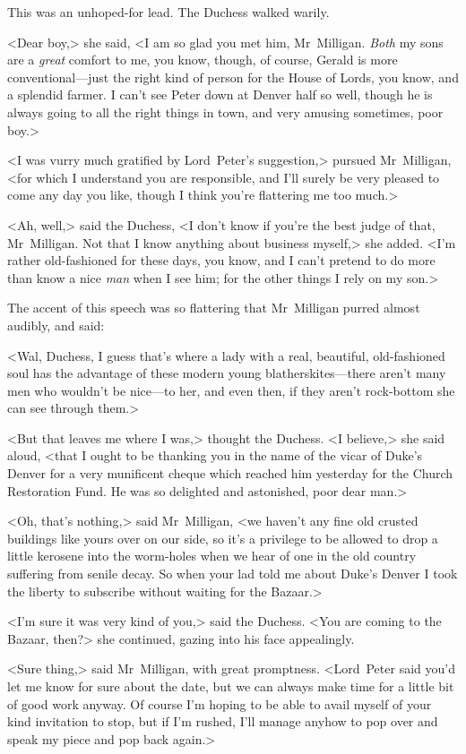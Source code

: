 This was an unhoped-for lead. The Duchess walked warily.

<Dear boy,> she said, <I am so glad you met him, Mr~Milligan. \textit{Both} my sons are a \textit{great} comfort to me, you know, though, of course, Gerald is more conventional—just the right kind of person for the House of Lords, you know, and a splendid farmer. I can't see Peter down at Denver half so well, though he is always going to all the right things in town, and very amusing sometimes, poor boy.>

<I was vurry much gratified by Lord~Peter's suggestion,> pursued Mr~Milligan, <for which I understand you are responsible, and I'll surely be very pleased to come any day you like, though I think you're flattering me too much.>

<Ah, well,> said the Duchess, <I don't know if you're the best judge of that, Mr~Milligan. Not that I know anything about business myself,> she added. <I'm rather old-fashioned for these days, you know, and I can't pretend to do more than know a nice \textit{man} when I see him; for the other things I rely on my son.>

The accent of this speech was so flattering that Mr~Milligan purred almost audibly, and said:

<Wal, Duchess, I guess that's where a lady with a real, beautiful, old-fashioned soul has the advantage of these modern young blatherskites—there aren't many men who wouldn't be nice—to her, and even then, if they aren't rock-bottom she can see through them.>

<But that leaves me where I was,> thought the Duchess. <I believe,> she said aloud, <that I ought to be thanking you in the name of the vicar of Duke's Denver for a very munificent cheque which reached him yesterday for the Church Restoration Fund. He was so delighted and astonished, poor dear man.>

<Oh, that's nothing,> said Mr~Milligan, <we haven't any fine old crusted buildings like yours over on our side, so it's a privilege to be allowed to drop a little kerosene into the worm-holes when we hear of one in the old country suffering from senile decay. So when your lad told me about Duke's Denver I took the liberty to subscribe without waiting for the Bazaar.>

<I'm sure it was very kind of you,> said the Duchess. <You are coming to the Bazaar, then?> she continued, gazing into his face appealingly.

<Sure thing,> said Mr~Milligan, with great promptness. <Lord~Peter said you'd let me know for sure about the date, but we can always make time for a little bit of good work anyway. Of course I'm hoping to be able to avail myself of your kind invitation to stop, but if I'm rushed, I'll manage anyhow to pop over and speak my piece and pop back again.>

